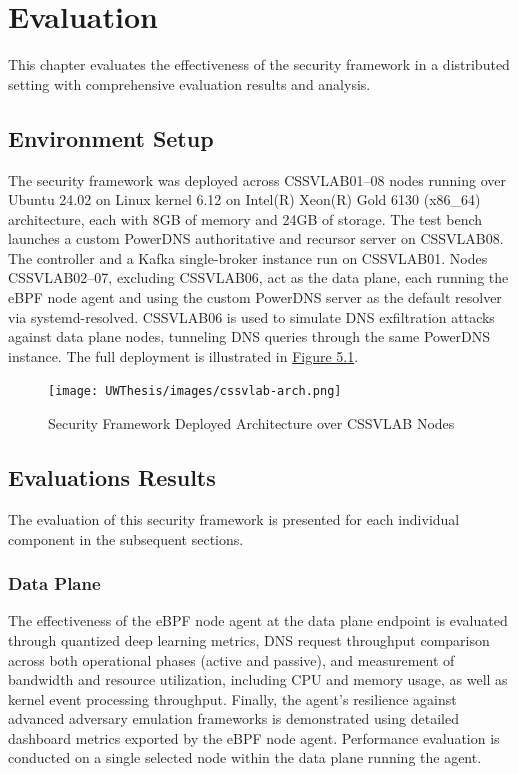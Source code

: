 \documentclass [11pt, proquest] {uwthesis}[2020/02/24]
\begin{document}





\chapter{Evaluation}
This chapter evaluates the effectiveness of the security framework in a distributed setting with  comprehensive evaluation results and analysis.


\section{Environment Setup}
The security framework was deployed across CSSVLAB{01–08} nodes running over Ubuntu 24.02 on Linux kernel 6.12 on Intel(R) Xeon(R) Gold 6130 (x86\_64) architecture, each with 8GB of memory and 24GB of storage. The test bench launches a custom PowerDNS authoritative and recursor server on CSSVLAB08. The controller and a Kafka single-broker instance run on CSSVLAB01. Nodes CSSVLAB{02–07}, excluding CSSVLAB06, act as the data plane, each running the eBPF node agent and using the custom PowerDNS server as the default resolver via systemd-resolved. CSSVLAB06 is used to simulate DNS exfiltration attacks against data plane nodes, tunneling DNS queries through the same PowerDNS instance. The full deployment is illustrated in \hyperref[sec:deployed-arch]{Figure 5.1}.


\begin{figure}[h]
\centering
\texttt{[image: UWThesis/images/cssvlab-arch.png]}
\caption{Security Framework Deployed Architecture over CSSVLAB Nodes}
\label{sec:deployed-arch}
\end{figure}


\section{Evaluations Results}
The evaluation of this security framework is presented for each individual component in the subsequent sections.

\subsection{Data Plane}
The effectiveness of the eBPF node agent at the data plane endpoint is evaluated through quantized deep learning metrics, DNS request throughput comparison across both operational phases (active and passive), and measurement of bandwidth and resource utilization, including CPU and memory usage, as well as kernel event processing throughput. Finally, the agent’s resilience against advanced adversary emulation frameworks is demonstrated using detailed dashboard metrics exported by the eBPF node agent. Performance evaluation is conducted on a single selected node within the data plane running the agent.
\end{document}

